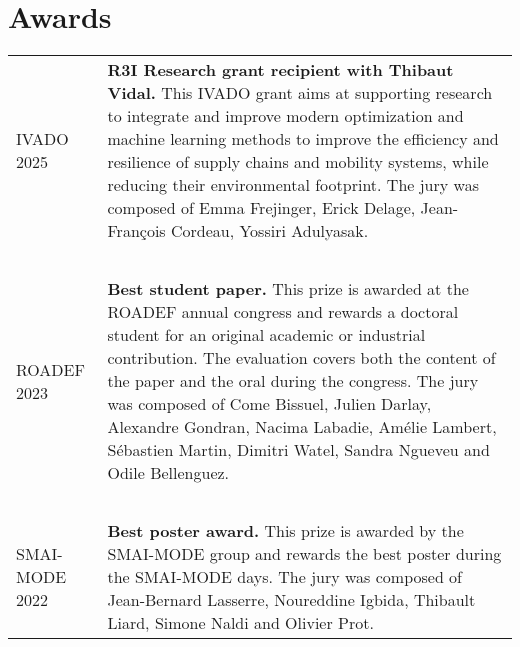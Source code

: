 \section{Awards}

\begin{longtable}[l]{@{}p{}p{}}
    IVADO 2025 & \textbf{R3I Research grant recipient with Thibaut Vidal.} This IVADO grant aims at supporting research to integrate and improve modern optimization and machine learning methods to improve the efficiency and resilience of supply chains and mobility systems, while reducing their environmental footprint. The jury was composed of Emma Frejinger, Erick Delage, Jean-François Cordeau, Yossiri Adulyasak. \\~\\
    ROADEF 2023 & \textbf{Best student paper.} This prize is awarded at the ROADEF annual congress and rewards a doctoral student for an original academic or industrial contribution. The evaluation covers both the content of the paper and the oral during the congress. The jury was composed of Come Bissuel, Julien Darlay, Alexandre Gondran, Nacima Labadie, Amélie Lambert, Sébastien Martin, Dimitri Watel, Sandra Ngueveu and Odile Bellenguez. \\~\\
    SMAI-MODE 2022 & \textbf{Best poster award.} This prize is awarded by the SMAI-MODE group and rewards the best poster during the SMAI-MODE days. The jury was composed of Jean-Bernard Lasserre, Noureddine Igbida, Thibault Liard, Simone Naldi and Olivier Prot. \\
\end{longtable}